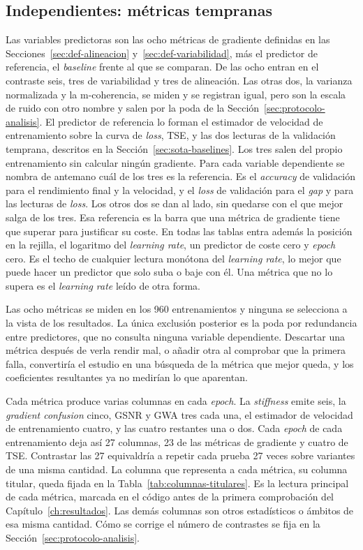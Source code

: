 \subsection{Independientes: métricas tempranas}

Las variables predictoras son las ocho métricas de gradiente definidas en las Secciones~\ref{sec:def-alineacion} y~\ref{sec:def-variabilidad}, más el predictor de referencia, el \emph{baseline} frente al que se comparan. De las ocho entran en el contraste seis, tres de variabilidad y tres de alineación. Las otras dos, la varianza normalizada y la m-coherencia, se miden y se registran igual, pero son la escala de ruido con otro nombre y salen por la poda de la Sección~\ref{sec:protocolo-analisis}. El predictor de referencia lo forman el estimador de velocidad de entrenamiento sobre la curva de \emph{loss}, TSE, y las dos lecturas de la validación temprana, descritos en la Sección~\ref{sec:sota-baselines}. Los tres salen del propio entrenamiento sin calcular ningún gradiente. Para cada variable dependiente se nombra de antemano cuál de los tres es la referencia. Es el \emph{accuracy} de validación para el rendimiento final y la velocidad, y el \emph{loss} de validación para el \emph{gap} y para las lecturas de \emph{loss}. Los otros dos se dan al lado, sin quedarse con el que mejor salga de los tres. Esa referencia es la barra que una métrica de gradiente tiene que superar para justificar su coste. En todas las tablas entra además la posición en la rejilla, el logaritmo del \emph{learning rate}, un predictor de coste cero y \emph{epoch} cero. Es el techo de cualquier lectura monótona del \emph{learning rate}, lo mejor que puede hacer un predictor que solo suba o baje con él. Una métrica que no lo supera es el \emph{learning rate} leído de otra forma.

Las ocho métricas se miden en los 960 entrenamientos y ninguna se selecciona a la vista de los resultados. La única exclusión posterior es la poda por redundancia entre predictores, que no consulta ninguna variable dependiente. Descartar una métrica después de verla rendir mal, o añadir otra al comprobar que la primera falla, convertiría el estudio en una búsqueda de la métrica que mejor queda, y los coeficientes resultantes ya no medirían lo que aparentan.

Cada métrica produce varias columnas en cada \emph{epoch}. La \emph{stiffness} emite seis, la \emph{gradient confusion} cinco, GSNR y GWA tres cada una, el estimador de velocidad de entrenamiento cuatro, y las cuatro restantes una o dos. Cada \emph{epoch} de cada entrenamiento deja así 27 columnas, 23 de las métricas de gradiente y cuatro de TSE. Contrastar las 27 equivaldría a repetir cada prueba 27 veces sobre variantes de una misma cantidad. La columna que representa a cada métrica, su columna titular, queda fijada en la Tabla~\ref{tab:columnas-titulares}. Es la lectura principal de cada métrica, marcada en el código antes de la primera comprobación del Capítulo~\ref{ch:resultados}. Las demás columnas son otros estadísticos o ámbitos de esa misma cantidad. Cómo se corrige el número de contrastes se fija en la Sección~\ref{sec:protocolo-analisis}.


